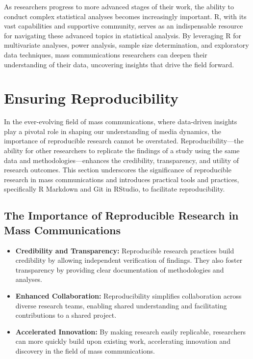 \documentclass[
]{book}
\begin{document}
As researchers progress to more advanced stages of their work, the ability to conduct complex statistical analyses becomes increasingly important. R, with its vast capabilities and supportive community, serves as an indispensable resource for navigating these advanced topics in statistical analysis. By leveraging R for multivariate analyses, power analysis, sample size determination, and exploratory data techniques, mass communications researchers can deepen their understanding of their data, uncovering insights that drive the field forward.

\hypertarget{ensuring-reproducibility}{%
\section{Ensuring Reproducibility}\label{ensuring-reproducibility}}

In the ever-evolving field of mass communications, where data-driven insights play a pivotal role in shaping our understanding of media dynamics, the importance of reproducible research cannot be overstated. Reproducibility---the ability for other researchers to replicate the findings of a study using the same data and methodologies---enhances the credibility, transparency, and utility of research outcomes. This section underscores the significance of reproducible research in mass communications and introduces practical tools and practices, specifically R Markdown and Git in RStudio, to facilitate reproducibility.

\hypertarget{the-importance-of-reproducible-research-in-mass-communications}{%
\subsection*{The Importance of Reproducible Research in Mass Communications}\label{the-importance-of-reproducible-research-in-mass-communications}}

\begin{itemize}
\item
  \textbf{Credibility and Transparency:} Reproducible research practices build credibility by allowing independent verification of findings. They also foster transparency by providing clear documentation of methodologies and analyses.
\item
  \textbf{Enhanced Collaboration:} Reproducibility simplifies collaboration across diverse research teams, enabling shared understanding and facilitating contributions to a shared project.
\item
  \textbf{Accelerated Innovation:} By making research easily replicable, researchers can more quickly build upon existing work, accelerating innovation and discovery in the field of mass communications.
\end{itemize}
\end{document}
